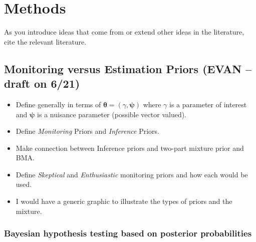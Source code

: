 \documentclass[12pt]{article}
\begin{document}
\section{Methods}

As you introduce ideas that come from or extend other ideas in the literature, cite the relevant literature.

\subsection{Monitoring versus Estimation Priors (EVAN -- draft on 6/21)}

\begin{itemize}
 \item Define generally in terms of $\boldsymbol\theta = \left( \gamma, \boldsymbol\psi  \right)$ where $\gamma$ is a parameter of interest
       and $\boldsymbol\psi$ is a nuisance parameter (possible vector valued).
 \item Define \textit{Monitoring} Priors and \textit{Inference} Priors.
 \item Make connection between Inference priors and two-part mixture prior and BMA.
 \item Define \textit{Skeptical} and \textit{Enthusiastic} monitoring priors and how each would be used.
 \item I would have a generic graphic to illustrate the types of priors and the mixture.
\end{itemize}

\subsubsection{Bayesian hypothesis testing based on posterior probabilities}
\end{document}

